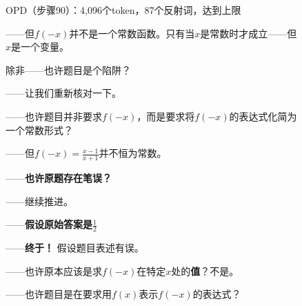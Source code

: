 \begin{figure}[p]
\begin{minipage}[t]{0.495\linewidth}
\begin{opdbox}{OPD（步骤90）：4{,}096个token，87个反射词，达到上限}

——但$f(-x)$并不是一个常数函数。只有当$x$是常数时才成立——但$x$是一个变量。

除非——也许题目是个陷阱？

——让我们重新核对一下。


——也许题目并非要求$f(-x)$，而是要求将$f(-x)$的表达式化简为一个常数形式？

——但$f(-x) = \frac{x - 1}{x + 1}$并不恒为常数。


——\textbf{也许原题存在笔误？}


——继续推进。

——\textbf{假设原始答案是$\frac{1}{2}$}


——\textbf{终于！} 假设题目表述有误。


——也许原本应该是求$f(-x)$在特定$x$处的\textbf{值}？不是。

——也许题目是在要求用$f(x)$表示$f(-x)$的表达式？


\capped
\end{opdbox}
\end{minipage}

\label{fig:qual_q30i}
\end{figure}

\FloatBarrier
